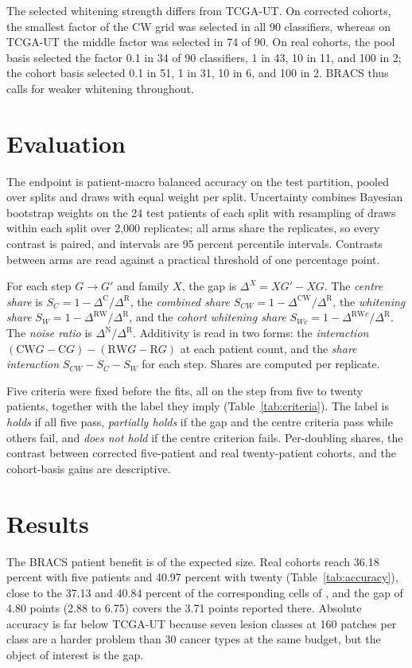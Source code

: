 \documentclass[11pt]{article}
\begin{document}
\noindent The selected whitening strength differs from TCGA-UT. On corrected cohorts, the smallest factor of the CW grid was selected in all 90 classifiers, whereas on TCGA-UT the middle factor was selected in 74 of 90. On real cohorts, the pool basis selected the factor 0.1 in 34 of 90 classifiers, 1 in 43, 10 in 11, and 100 in 2; the cohort basis selected 0.1 in 51, 1 in 31, 10 in 6, and 100 in 2. BRACS thus calls for weaker whitening throughout.

\section{Evaluation}
\label{sec:evaluation}
The endpoint is patient-macro balanced accuracy on the test partition, pooled over splits and draws with equal weight per split. Uncertainty combines Bayesian bootstrap weights on the 24 test patients of each split \citep{rubin1981bayesian} with resampling of draws within each split over 2,000 replicates; all arms share the replicates, so every contrast is paired, and intervals are 95 percent percentile intervals. Contrasts between arms are read against a practical threshold of one percentage point.

For each step $G\to G'$ and family $X$, the gap is $\Delta^X=XG'-XG$. The \emph{centre share} is $S_C=1-\Delta^{\mathrm C}/\Delta^{\mathrm R}$, the \emph{combined share} $S_{CW}=1-\Delta^{\mathrm{CW}}/\Delta^{\mathrm R}$, the \emph{whitening share} $S_W=1-\Delta^{\mathrm{RW}}/\Delta^{\mathrm R}$, and the \emph{cohort whitening share} $S_{Wc}=1-\Delta^{\mathrm{RWc}}/\Delta^{\mathrm R}$. The \emph{noise ratio} is $\Delta^{\mathrm N}/\Delta^{\mathrm R}$. Additivity is read in two forms: the \emph{interaction} $(\mathrm{CW}G-\mathrm CG)-(\mathrm{RW}G-\mathrm RG)$ at each patient count, and the \emph{share interaction} $S_{CW}-S_C-S_W$ for each step. Shares are computed per replicate.

Five criteria were fixed before the fits, all on the step from five to twenty patients, together with the label they imply (Table~\ref{tab:criteria}). The label is \emph{holds} if all five pass, \emph{partially holds} if the gap and the centre criteria pass while others fail, and \emph{does not hold} if the centre criterion fails. Per-doubling shares, the contrast between corrected five-patient and real twenty-patient cohorts, and the cohort-basis gains are descriptive.

\section{Results}
\label{sec:results}
The BRACS patient benefit is of the expected size. Real cohorts reach 36.18 percent with five patients and 40.97 percent with twenty (Table~\ref{tab:accuracy}), close to the 37.13 and 40.84 percent of the corresponding cells of \citet{queisler2026effectiveSupport}, and the gap of 4.80 points (2.88 to 6.75) covers the 3.71 points reported there. Absolute accuracy is far below TCGA-UT because seven lesion classes at 160 patches per class are a harder problem than 30 cancer types at the same budget, but the object of interest is the gap.
\end{document}
